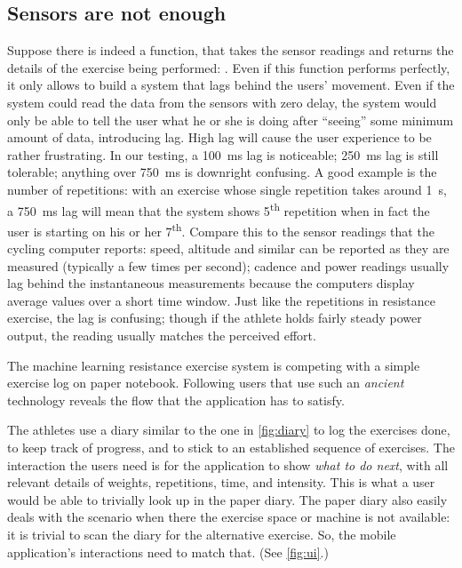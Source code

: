 \subsection{Sensors are not enough}
Suppose there is indeed a function\cite{Knight:2006ki}, \cite{Morris:2014ir} that takes the sensor readings and returns the details of the exercise being performed: . Even if this function performs perfectly, it only allows to build a system that lags behind the users' movement. Even if the system could read the data from the sensors with zero delay, the system would only be able to tell the user what he or she is doing after ``seeing'' some minimum amount of data, introducing lag. High lag will cause the user experience to be rather frustrating. In our testing, a \SI{100}{\milli\second} lag is noticeable; \SI{250}{\milli\second} lag is still tolerable; anything over \SI{750}{\milli\second} is downright confusing. A good example is the number of repetitions: with an exercise whose single repetition takes around \SI{1}{\second}, a \SI{750}{\milli\second} lag will mean that the system shows 5\textsuperscript{th} repetition when in fact the user is starting on his or her 7\textsuperscript{th}. Compare this to the sensor readings that the cycling computer reports: speed, altitude and similar can be reported as they are measured (typically a few times per second); cadence and power readings usually lag behind the instantaneous measurements because the computers display average values over a short time window. Just like the repetitions in resistance exercise, the lag is confusing; though if the athlete holds fairly steady power output, the reading usually matches the perceived effort.

The machine learning resistance exercise system is competing with a simple exercise log on paper notebook. Following users that use such an \emph{ancient} technology reveals the flow that the application has to satisfy. 


The athletes use a diary similar to the one in \autoref{fig:diary} to log the exercises done, to keep track of progress, and to stick to an established sequence of exercises. The interaction the users need is for the application to show \emph{what to do next}, with all relevant details of weights, repetitions, time, and intensity. This is what a user would be able to trivially look up in the paper diary. The paper diary also easily deals with the scenario when there the exercise space or machine is not available: it is trivial to scan the diary for the alternative exercise. So, the mobile application's interactions need to match that. (See \autoref{fig:ui}.)

